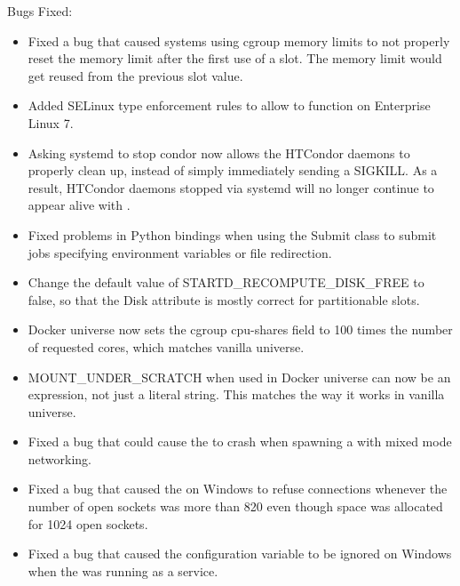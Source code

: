 \noindent Bugs Fixed:

\begin{itemize}

\item Fixed a bug that caused systems using cgroup memory limits to
not properly reset the memory limit after the first use of a slot.  The memory
limit would get reused from the previous slot value.

\item Added SELinux type enforcement rules to allow 
to function on Enterprise Linux 7.

\item Asking systemd to stop condor now allows the HTCondor daemons to properly
clean up, instead of simply immediately sending a SIGKILL.  As a result,
HTCondor daemons stopped via systemd will no longer continue to appear
alive with .

\item Fixed problems in Python bindings when using the Submit class
to submit jobs specifying environment variables or file redirection.

\item Change the default value of STARTD\_RECOMPUTE\_DISK\_FREE to false, so
that the Disk attribute is mostly correct for partitionable slots.

\item Docker universe now sets the cgroup cpu-shares field to 100 times the
number of requested cores, which matches vanilla universe.

\item MOUNT\_UNDER\_SCRATCH when used in Docker universe can now be an
expression, not just a literal string.
This matches the way it works in vanilla universe.

\item Fixed a bug that could cause the  to crash when spawning
a  with mixed mode networking.

\item Fixed a bug that caused the  on Windows to refuse
connections whenever the number of open sockets was more than 820 even though
space was allocated for 1024 open sockets.

\item Fixed a bug that caused the configuration variable
 to be ignored on Windows when the
 was running as a service.


\end{itemize}
